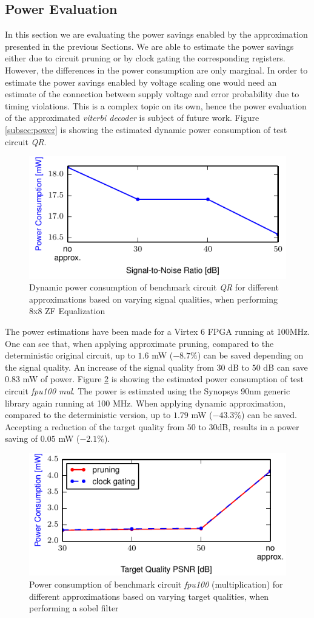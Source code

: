 \documentclass[conference]{IEEEtran}
\begin{document}
\subsection{Power Evaluation}
In this section we are evaluating the power savings enabled by the approximation presented in the previous Sections. We are able to estimate the power savings either due to circuit pruning or by clock gating the corresponding registers. However, the differences in the power consumption are only marginal. In order to estimate the power savings enabled by voltage scaling one would need an estimate of the connection between supply voltage and error probability due to timing violations. This is a complex topic on its own, hence the power evaluation of the approximated \emph{viterbi decoder} is subject of future work. Figure \ref{subsec:power} is showing the estimated dynamic power consumption of test circuit \emph{QR}. 
\label{subsec:power}
\begin{figure}[htb]
  \centering
  \includegraphics[width=.48\textwidth]{figs/power_qr}
  \caption{Dynamic power consumption of benchmark circuit \emph{QR} for different approximations based on varying signal qualities, when performing 8x8 ZF Equalization}
  \label{fig:power_qr}
\end{figure}
The power estimations have been made for a Virtex 6 FPGA running at 100MHz. One can see that, when applying approximate pruning, compared to the deterministic original circuit, up to $1.6$ mW ($-8.7\%$) can be saved depending on the signal quality. An increase of the signal quality from $30$ dB to $50$ dB can save $0.83$ mW of power.
Figure \ref{fig:power_fpu} is showing the estimated power consumption of test circuit \emph{fpu100 mul}. The power is estimated using the Synopsys 90nm generic library again running at 100 MHz. When applying dynamic approximation, compared to the deterministic version, up to $1.79$ mW ($-43.3\%$) can be saved. Accepting a reduction of the target quality from $50$ to $30$dB, results in a power saving of $0.05$ mW ($-2.1\%$).
\begin{figure}[htb]
  \centering
  \includegraphics[width=.48\textwidth]{figs/power_fpu}
  \caption{Power consumption of benchmark circuit \emph{fpu100} (multiplication) for different approximations based on varying target qualities, when performing a sobel filter}
  \label{fig:power_fpu}
\end{figure}
\end{document}
